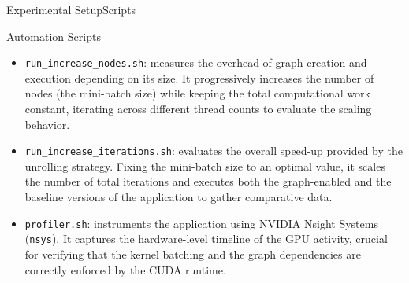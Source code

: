 \documentclass[10pt,aspectratio=43]{beamer}
\begin{document}
\begin{frame}{Experimental Setup}{Scripts}
    \begin{block}{Automation Scripts}
        \begin{itemize}
        \item \texttt{run\_increase\_nodes.sh}: measures the overhead of graph creation and execution depending on its size. It progressively increases the number of nodes (the mini-batch size) while keeping the total computational work constant, iterating across different thread counts to evaluate the scaling behavior.
        \item \texttt{run\_increase\_iterations.sh}: evaluates the overall speed-up provided by the unrolling strategy. Fixing the mini-batch size to an optimal value, it scales the number of total iterations and executes both the graph-enabled and the baseline versions of the application to gather comparative data.
        \item \texttt{profiler.sh}: instruments the application using NVIDIA Nsight Systems (\texttt{nsys}). It captures the hardware-level timeline of the GPU activity, crucial for verifying that the kernel batching and the graph dependencies are correctly enforced by the CUDA runtime.
        \end{itemize}
    \end{block}
\end{frame}
\end{document}
